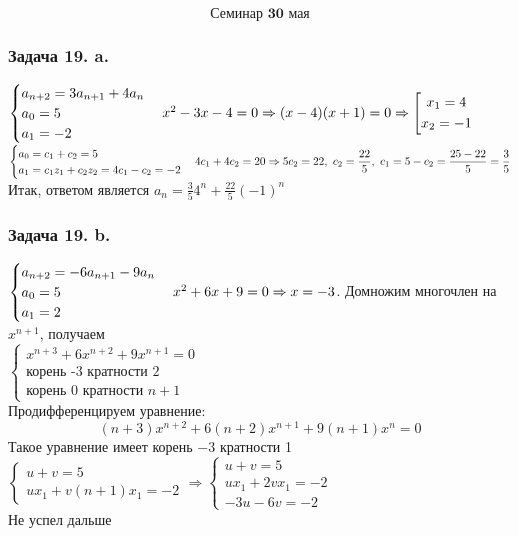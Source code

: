 \documentclass[12pt, letterpaper, twoside]{article}
\begin{document}
\[\textbf{Семинар 30 мая}\]
    \subsubsection*{Задача 19. a.}
    $\begin{cases}
        a_{n + 2} = 3a_{n + 1} + 4a_n\\
        a_0 = 5\\
        a_1 = -2
    \end{cases}\\
    x^2 - 3x - 4 = 0\Rightarrow (x - 4)(x + 1) = 0\Rightarrow \left[\begin{gathered}
        x_1 = 4\\
        x_2 = -1
    \end{gathered}\right.$\\
    $\begin{cases}
        a_0 = c_1 + c_2 = 5\\
        a_1 = c_1 z_1 + c_2 z_2 = 4c_1 - c_2 = -2
    \end{cases}\\
    4c_1 + 4c_2 = 20\Rightarrow 5c_2 = 22,\ c_2 = \dfrac{22}{5},\ c_1 = 5 - c_2 = \dfrac{25 - 22}{5} = \dfrac{3}{5}$\\
    Итак, ответом является $a_n = \frac{3}{5}4^{n} + \frac{22}{5}(-1)^n$

    \subsubsection*{Задача 19. b.}
    $\begin{cases}
        a_{n + 2} = -6 a_{n + 1} - 9 a_n\\
        a_0 = 5\\
        a_1 = 2
    \end{cases}\\
    x^2 + 6x + 9 = 0\Rightarrow x = -3$. Домножим многочлен на $x^{n + 1}$, получаем\\
    $\begin{cases}
        x^{n + 3} + 6x^{n + 2} + 9x^{n + 1} = 0\\
        \text{корень -3 кратности 2}\\
        \text{корень 0 кратности $n + 1$}
    \end{cases}$\\
    Продифференцируем уравнение:
    \[(n + 3)x^{n + 2} + 6(n + 2)x^{n + 1} + 9(n + 1)x^{n} = 0\]
    Такое уравнение имеет корень $-3$ кратности 1\\
    $\begin{cases}
        u + v = 5\\
        ux_1 + v(n + 1)x_1 = -2
    \end{cases}\Rightarrow \begin{cases}
        u + v = 5\\
        ux_1 + 2vx_1 = -2\\
        -3u - 6v = -2
    \end{cases}$\\
    Не успел дальше
\end{document}
